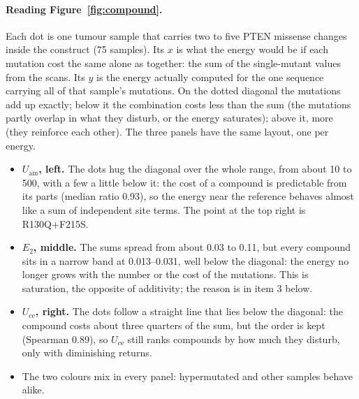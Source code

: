 \documentclass[11pt,a4paper]{article}
\newcommand{\Uam}{U_{\mathrm{am}}}
\newcommand{\Uce}{U_{\mathrm{ce}}}
\newcommand{\Etwo}{E_{2}}
\begin{document}
\paragraph{Reading Figure~\ref{fig:compound}.} Each dot is one tumour sample
that carries two to five PTEN missense changes inside the construct (75
samples). Its $x$ is what the energy would be if each mutation cost the same
alone as together: the sum of the single-mutant values from the scans. Its $y$
is the energy actually computed for the one sequence carrying all of that
sample's mutations. On the dotted diagonal the mutations add up exactly; below
it the combination costs less than the sum (the mutations partly overlap in
what they disturb, or the energy saturates); above it, more (they reinforce
each other). The three panels have the same layout, one per energy.
\begin{itemize}
\item \textbf{$\Uam$, left.} The dots hug the diagonal over the whole range,
  from about 10 to 500, with a few a little below it: the cost of a
  compound is predictable from its parts (median ratio 0.93), so the energy
  near the reference behaves almost like a sum of independent site terms.
  The point at the top right is R130Q+F215S.
\item \textbf{$\Etwo$, middle.} The sums spread from about 0.03 to 0.11, but every
  compound sits in a narrow band at 0.013--0.031, well below the diagonal:
  the energy no longer grows with the number or the cost of the mutations.
  This is saturation, the opposite of additivity; the reason is in item 3
  below.
\item \textbf{$\Uce$, right.} The dots follow a straight line that lies
  below the diagonal: the compound costs about three quarters of the sum, but
  the order is kept (Spearman 0.89), so $\Uce$ still ranks compounds by how
  much they disturb, only with diminishing returns.
\item The two colours mix in every panel: hypermutated and other samples
  behave alike.
\end{itemize}
\end{document}
